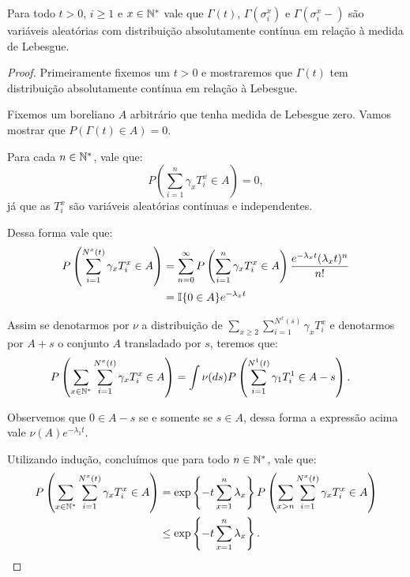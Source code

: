 \begin{proposicao}
  \label{prop:gamma-dist-continua}
  Para todo $t > 0$, $i \geq 1$ e $x \in {\mathbb{N^*}}$ vale que $\Gamma(t)$,
  $\Gamma(\sigma^x_i)$ e $\Gamma(\sigma^x_i-)$ são variáveis
  aleatórias com distribuição absolutamente contínua em relação à
  medida de Lebesgue.
\end{proposicao}
\begin{proof}

  Primeiramente fixemos um $t > 0$ e mostraremos que $\Gamma(t)$ tem
  distribuição absolutamente contínua em relação à Lebesgue.

  Fixemos um boreliano $A$ arbitrário que tenha medida de Lebesgue
  zero. Vamos mostrar que $P(\Gamma(t) \in A) = 0$.


  Para cada $n \in {\mathbb{N^*}}$, vale que:
  \begin{displaymath}
    P\left(\sum_{i = 1}^n \gamma_x T_i^x \in A \right) = 0,
  \end{displaymath}
  já que as $T_i^x$ são variáveis aleatórias contínuas e
  independentes.

  Dessa forma vale que:
  \begin{align*}
    P\left(\sum_{i = 1}^{N^x(t)} \gamma_x T_i^x \in A \right) 
    &= \sum_{n = 0}^{\infty}
    P\left(\sum_{i = 1}^n \gamma_x T_i^x \in A \right)
    \frac{e^{-\lambda_x t} (\lambda_x t)^n}{n!}\\
    &= {\mathbb{I}}\{ 0 \in A\} e^{-\lambda_x t} 
  \end{align*}

  Assim se denotarmos por $\nu$ a distribuição de $\sum_{x \geq 2}
  \sum_{i = 1}^{N^x(s)} \gamma_x T_i^x$ e denotarmos por $A+s$ o
  conjunto $A$ transladado por $s$, teremos que:
  \begin{align*}
    P\left(\sum_{x \in {\mathbb{N^*}}}\sum_{i = 1}^{N^x(t)} \gamma_x T_i^x \in A  \right) 
    &= \int \nu(d s) P\left(\sum_{i = 1}^{N^1(t)} \gamma_1 T_i^1 \in A - s\right).
  \end{align*}

  Observemos que $0 \in A - s$ se e somente se $s \in A$, dessa forma
  a expressão acima vale $\nu(A) e^{-\lambda_1 t}$.

  Utilizando indução, concluímos que para todo $n \in {\mathbb{N^*}}$, vale que:
  \begin{align*}
    P\left(\sum_{x \in {\mathbb{N^*}}}\sum_{i = 1}^{N^x(t)} \gamma_x T_i^x \in A \right) 
    &= \exp\left\{ -t \sum_{x = 1}^n \lambda_x \right\}
    P\left(\sum_{x > n} \sum_{i = 1}^{N^x(t)} \gamma_x T_i^x \in A \right) \\
    &\leq \exp\left\{ -t \sum_{x = 1}^n \lambda_x \right\}.
  \end{align*}


\end{proof}
